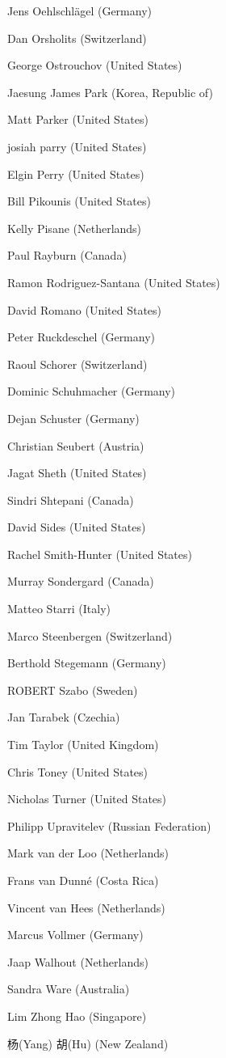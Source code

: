 Jens Oehlschlägel (Germany)

Dan Orsholits (Switzerland)

George Ostrouchov (United States)

Jaesung James Park (Korea, Republic of)

Matt Parker (United States)

josiah parry (United States)

Elgin Perry (United States)

Bill Pikounis (United States)

Kelly Pisane (Netherlands)

Paul Rayburn (Canada)

Ramon Rodriguez-Santana (United States)

David Romano (United States)

Peter Ruckdeschel (Germany)

Raoul Schorer (Switzerland)

Dominic Schuhmacher (Germany)

Dejan Schuster (Germany)

Christian Seubert (Austria)

Jagat Sheth (United States)

Sindri Shtepani (Canada)

David Sides (United States)

Rachel Smith-Hunter (United States)

Murray Sondergard (Canada)

Matteo Starri (Italy)

Marco Steenbergen (Switzerland)

Berthold Stegemann (Germany)

ROBERT Szabo (Sweden)

Jan Tarabek (Czechia)

Tim Taylor (United Kingdom)

Chris Toney (United States)

Nicholas Turner (United States)

Philipp Upravitelev (Russian Federation)

Mark van der Loo (Netherlands)

Frans van Dunné (Costa Rica)

Vincent van Hees (Netherlands)

Marcus Vollmer (Germany)

Jaap Walhout (Netherlands)

Sandra Ware (Australia)

Lim Zhong Hao (Singapore)

杨(Yang) 胡(Hu) (New Zealand)


\address{%
Torsten Hothorn\\
Universität Zürich\\%
Switzerland\\
%
%
\textit{ORCiD: \href{https://orcid.org/0000-0001-8301-0471}{0000-0001-8301-0471}}\\%
\href{mailto:Torsten.Hothorn@R-project.org}{\nolinkurl{Torsten.Hothorn@R-project.org}}%
}
